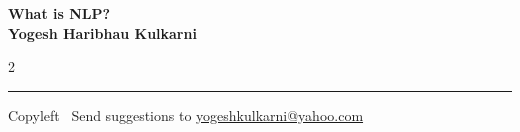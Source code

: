 \documentclass[8pt,landscape]{article}
\begin{document}
\footnotesize


\begin{center}
\Large{\textbf{What is NLP?\\ Yogesh Haribhau Kulkarni}}  
\end{center}

\begin{multicols}{2}

\end{multicols}

\rule{\linewidth}{0.25pt}
\scriptsize
Copyleft \textcopyleft\  Send suggestions to 
\href{http://www.yogeshkulkarni.com}{yogeshkulkarni@yahoo.com}
\end{document}
